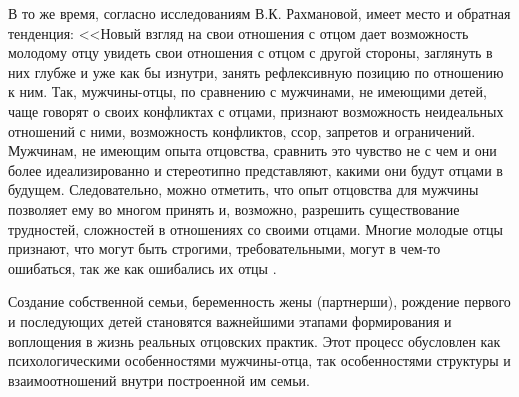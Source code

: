 \documentclass{../../common/thesisbyxetex}
\begin{document}
В то же время, согласно исследованиям В.К. Рахмановой, имеет место и обратная тенденция: <<Новый
взгляд на свои отношения с отцом дает возможность молодому отцу увидеть свои отношения с отцом с
другой стороны, заглянуть в них глубже и уже как бы изнутри, занять рефлексивную позицию по
отношению
к ним. Так, мужчины-отцы, по сравнению с мужчинами, не имеющими детей, чаще говорят о своих
конфликтах с отцами, признают возможность неидеальных отношений с ними, возможность конфликтов,
ссор, запретов и ограничений. Мужчинам, не имеющим опыта отцовства, сравнить это чувство не с чем и
они более идеализированно и стереотипно представляют, какими они будут отцами в будущем.
Следовательно, можно отметить, что опыт отцовства для мужчины позволяет ему во многом принять и,
возможно, разрешить существование трудностей, сложностей в отношениях со своими отцами. Многие
молодые отцы признают, что могут быть строгими, требовательными, могут в чем-то ошибаться, так же
как
ошибались их отцы \cite[54]{relot}.


Создание собственной семьи, беременность жены  (партнерши), рождение первого и последующих детей
становятся важнейшими этапами формирования и воплощения в жизнь реальных отцовских практик. Этот
процесс обусловлен как психологическими особенностями мужчины-отца, так особенностями структуры и
взаимоотношений внутри построенной им семьи.
\end{document}
